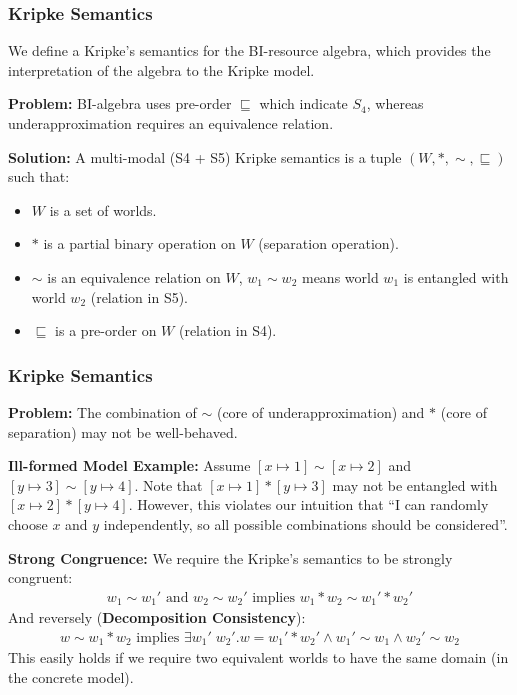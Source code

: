 \begin{frame}[fragile]
    \frametitle{Kripke Semantics}

We define a Kripke's semantics for the BI-resource algebra, which provides the interpretation of the algebra to the Kripke model.

\textbf{Problem:} BI-algebra uses pre-order $\sqsubseteq$ which indicate $S_4$, whereas underapproximation requires an equivalence relation.

\textbf{Solution:} A multi-modal (S4 + S5) Kripke semantics is a tuple $(W, *, \sim, \sqsubseteq)$ such that:
\begin{itemize}
    \item $W$ is a set of worlds.
    \item $*$ is a partial binary operation on $W$ (separation operation).
    \item $\sim$ is an equivalence relation on $W$, $w_1 \sim w_2$ means world $w_1$ is entangled with world $w_2$ (relation in S5).
    \item $\sqsubseteq$ is a pre-order on $W$ (relation in S4).
\end{itemize}

\end{frame}

\begin{frame}[fragile]
    \frametitle{Kripke Semantics}

\textbf{Problem:} The combination of $\sim$ (core of underapproximation) and $*$ (core of separation) may not be well-behaved.

\textbf{Ill-formed Model Example:} Assume $[x\mapsto 1] \sim [x\mapsto 2]$ and $[y\mapsto 3] \sim [y\mapsto 4]$. Note that $[x\mapsto 1] * [y\mapsto 3]$ may not be entangled with $[x\mapsto 2] * [y\mapsto 4]$. However, this violates our intuition that ``I can randomly choose $x$ and $y$ independently, so all possible combinations should be considered''.

\textbf{Strong Congruence:} We require the Kripke's semantics to be strongly congruent:
\begin{align*}
    w_1 \sim w_1' \text{ and } w_2 \sim w_2' \text{ implies } w_1 * w_2 \sim w_1' * w_2'
\end{align*}\noindent
And reversely (\textbf{Decomposition Consistency}):
\begin{align*}
    w \sim w_1 * w_2 \text{ implies } \exists w_1'\; w_2'. w = w_1' * w_2' \land w_1' \sim w_1 \land w_2' \sim w_2
\end{align*}\noindent
This easily holds if we require two equivalent worlds to have the same domain (in the concrete model).

\end{frame}

